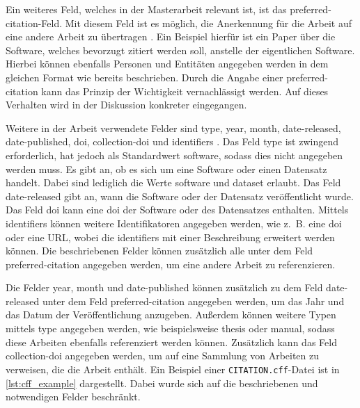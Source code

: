 Ein weiteres Feld, welches in der Masterarbeit relevant ist, ist das \glqq preferred-citation\grqq{}-Feld.
Mit diesem Feld ist es möglich, die Anerkennung für die Arbeit auf eine andere Arbeit zu übertragen \autocite{druskat_citation_2021}.
Ein Beispiel hierfür ist ein Paper über die Software, welches bevorzugt zitiert werden soll, anstelle der eigentlichen Software.
Hierbei können ebenfalls Personen und Entitäten angegeben werden in dem gleichen Format wie bereits beschrieben.
Durch die Angabe einer \glqq preferred-citation\grqq{} kann das Prinzip der Wichtigkeit vernachlässigt werden.
Auf dieses Verhalten wird in der Diskussion konkreter eingegangen.

Weitere in der Arbeit verwendete Felder sind \glqq type\grqq{}, \glqq year\grqq{}, \glqq month\grqq{}, \glqq date-released\grqq{}, \glqq date-published\grqq{}, \glqq doi\grqq{}, \glqq collection-doi\grqq{} und \glqq identifiers\grqq{} \autocite{druskat_citation_2021}.
Das Feld \glqq type\grqq{} ist zwingend erforderlich, hat jedoch als Standardwert \glqq software\grqq{}, sodass dies nicht angegeben werden muss.
Es gibt an, ob es sich um eine Software oder einen Datensatz handelt.
Dabei sind lediglich die Werte \glqq software\grqq{} und \glqq dataset\grqq{} erlaubt.
Das Feld \glqq date-released\grqq{} gibt an, wann die Software oder der Datensatz veröffentlicht wurde.
Das Feld \glqq doi\grqq{} kann eine \gls{doi} der Software oder des Datensatzes enthalten.
Mittels \glqq identifiers\grqq{} können weitere Identifikatoren angegeben werden, wie z. B. eine \gls{doi} oder eine URL, wobei die \glqq identifiers\grqq{} mit einer Beschreibung erweitert werden können.
Die beschriebenen Felder können zusätzlich alle unter dem Feld \glqq preferred-citation\grqq{} angegeben werden, um eine andere Arbeit zu referenzieren.

Die Felder \glqq year\grqq{}, \glqq month\grqq{} und \glqq date-published\grqq{} können zusätzlich zu dem Feld \glqq date-released\grqq{} unter dem Feld \glqq preferred-citation\grqq{} angegeben werden, um das Jahr und das Datum der Veröffentlichung anzugeben.
Außerdem können weitere Typen mittels \glqq type\grqq{} angegeben werden, wie beispielsweise \glqq thesis\grqq{} oder \glqq manual\grqq{}, sodass diese Arbeiten ebenfalls referenziert werden können.
Zusätzlich kann das Feld \glqq collection-doi\grqq{} angegeben werden, um auf eine Sammlung von Arbeiten zu verweisen, die die Arbeit enthält.
Ein Beispiel einer \texttt{CITATION.cff}-Datei ist in \autoref{lst:cff_example} dargestellt.
Dabei wurde sich auf die beschriebenen und notwendigen Felder beschränkt.

